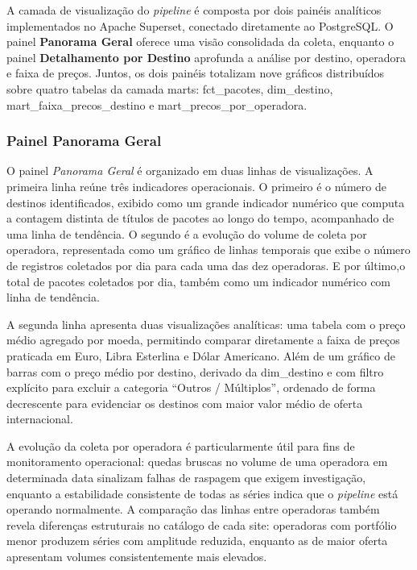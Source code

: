 A camada de visualização do \textit{pipeline} é composta por dois painéis analíticos
implementados no Apache Superset, conectado diretamente ao PostgreSQL. O painel
\textbf{Panorama Geral} oferece uma visão consolidada da coleta, enquanto o painel
\textbf{Detalhamento por Destino} aprofunda a análise por destino, operadora e faixa
de preços. Juntos, os dois painéis totalizam nove gráficos distribuídos sobre quatro
tabelas da camada marts: fct\_pacotes, dim\_destino, mart\_faixa\_precos\_destino e mart\_precos\_por\_operadora.

\subsubsection{Painel Panorama Geral}

O painel \textit{Panorama Geral} é organizado em duas linhas de visualizações. A
primeira linha reúne três indicadores operacionais. O primeiro é o número de destinos
identificados, exibido como um grande indicador numérico que
computa a contagem distinta de títulos de pacotes ao longo do tempo,
acompanhado de uma linha de tendência. O segundo é a evolução do volume de coleta por
operadora, representada como um gráfico de linhas temporais que exibe o número de
registros coletados por dia para cada uma das dez operadoras. E por último,o total de pacotes
coletados por dia, também como um indicador numérico com linha de tendência.

A segunda linha apresenta duas visualizações analíticas: uma tabela com o preço
médio agregado por moeda, permitindo comparar diretamente a faixa de preços praticada em Euro, Libra Esterlina e Dólar
Americano. Além de um gráfico de barras com o preço médio por destino, derivado da
dim\_destino e com filtro explícito para excluir a categoria ``Outros /
Múltiplos'', ordenado de forma decrescente para evidenciar os destinos com maior
valor médio de oferta internacional.

A evolução da coleta por operadora é particularmente útil para fins de
monitoramento operacional: quedas bruscas no volume de uma operadora em determinada
data sinalizam falhas de raspagem que exigem investigação, enquanto a estabilidade
consistente de todas as séries indica que o \textit{pipeline} está operando
normalmente. A comparação das linhas entre operadoras também revela diferenças
estruturais no catálogo de cada site: operadoras com portfólio menor produzem séries
com amplitude reduzida, enquanto as de maior oferta apresentam volumes consistentemente
mais elevados.

